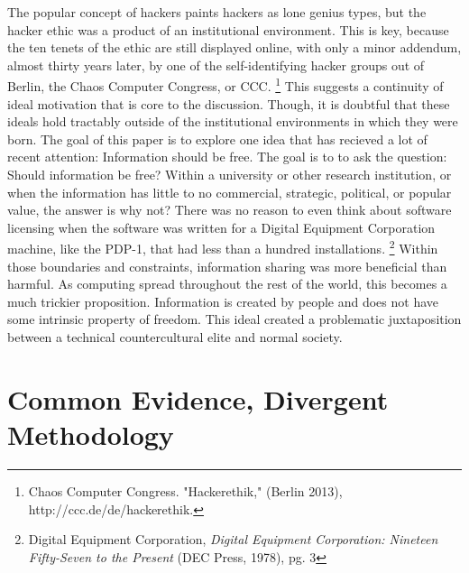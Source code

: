 \documentclass[11pt]{article}
\begin{document}
The popular concept of hackers paints hackers as lone genius types, but the hacker ethic was a product of an institutional environment. This is key, because the ten tenets of the ethic are still displayed online, with only a minor addendum, almost thirty years later, by one of the self-identifying hacker groups out of Berlin, the Chaos Computer Congress, or CCC.
\footnote{Chaos Computer Congress. "Hackerethik," (Berlin 2013), http://ccc.de/de/hackerethik.} This suggests a continuity of ideal motivation that is core to the discussion. Though, it is doubtful that these ideals hold tractably outside of the institutional environments in which they were born. The goal of this paper is to explore one idea that has recieved a lot of recent attention: Information should be free. The goal is to to ask the question: Should information be free? Within a university or other research institution, or when the information has little to no commercial, strategic, political, or popular value, the answer is why not? There was no reason to even think about software licensing when the software was written for a Digital Equipment Corporation machine, like the PDP-1, that had less than a hundred installations.
\footnote{Digital Equipment Corporation, \emph{Digital Equipment Corporation: Nineteen Fifty-Seven to the Present} (DEC Press, 1978), pg. 3}
Within those boundaries and constraints, information sharing was more beneficial than harmful. As computing spread throughout the rest of the world, this becomes a much trickier proposition. Information is created by people and does not have some intrinsic property of freedom. This ideal created a problematic juxtaposition between a technical countercultural elite and normal society.

\newpage
\section{Common Evidence,  Divergent Methodology}
\end{document}
